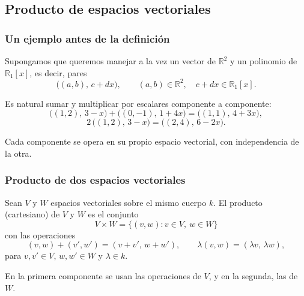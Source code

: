 \subsection{Producto de espacios vectoriales}

\begin{frame}
    \frametitle{Un ejemplo antes de la definición}

    Supongamos que queremos manejar a la vez un vector de $\mathbb{R}^2$
    y un polinomio de $\mathbb{R}_1[x]$, es decir, pares
    \[
        \bigl((a,b),\,c+dx\bigr),
        \qquad
        (a,b)\in\mathbb{R}^2,
        \quad
        c+dx\in\mathbb{R}_1[x].
    \]

    Es natural sumar y multiplicar por escalares
    \alert{componente a componente}:
    \[
        \bigl((1,2),\,3-x\bigr)+\bigl((0,-1),\,1+4x\bigr)
        =
        \bigl((1,1),\,4+3x\bigr),
    \]
    \[
        2\,\bigl((1,2),\,3-x\bigr)
        =
        \bigl((2,4),\,6-2x\bigr).
    \]

    \medskip

    Cada componente se opera en su propio espacio vectorial,
    con independencia de la otra.
\end{frame}


\begin{frame}
    \frametitle{Producto de dos espacios vectoriales}

    \begin{definition}
        Sean $V$ y $W$ espacios vectoriales sobre el mismo cuerpo $k$.
        El \alert{producto (cartesiano)} de $V$ y $W$ es el conjunto
        \[
            V\times W=\{(v,w):v\in V,\ w\in W\}
        \]
        con las operaciones
        \[
            (v,w)+(v',w')=(v+v',\,w+w'),
            \qquad
            \lambda(v,w)=(\lambda v,\,\lambda w),
        \]
        para $v,v'\in V$, $w,w'\in W$ y $\lambda\in k$.
    \end{definition}

    \medskip

    En la primera componente se usan las operaciones de $V$,
    y en la segunda, las de $W$.
\end{frame}


